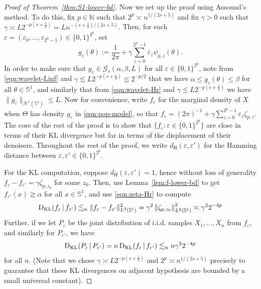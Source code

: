 \documentclass[preprint]{imsart}
\theoremstyle{plain}
\theoremstyle{definition}
\newcommand{\Nbb}{\mathbb{N}}
\newcommand{\Hcal}{\mathcal{H}}
\DeclareMathOperator{\KL}{D_{\textnormal{KL}}}
\begin{document}
\begin{appendix}
\begin{proof}[Proof of Theorem~\ref{thm:S1-lower-bd}]
    Now we set up the proof using Assouad's method.
    To do this, fix $p\in\Nbb$ such that $2^p\asymp n^{1/(2s+5)}$ and fix $\gamma>0$ such that $\gamma\asymp L2^{-p(s+\frac{1}{2})}=Ln^{-(s+\frac{1}{2})/(2s+5)}$.
    Then, for each $\varepsilon = (\varepsilon_0,\ldots, \varepsilon_{2^p-1})\in\{0,1\}^{2^p}$, set
    \begin{equation*}
        g_{\varepsilon}(\theta):= \frac{1}{2\pi}+\gamma\sum_{z=0}^{2^p-1}\varepsilon_z\psi_{p,z}(\theta).
    \end{equation*}
    In order to make sure that $g_{\varepsilon}\in \mathcal{G}_s(\alpha,\beta,L)$ for all $\varepsilon\in\{0,1\}^{2^p}$, note from \eqref{eqn:wavelet-Linf} and $\gamma\lesssim L2^{-p\left(s+\frac{1}{2}\right)}\lesssim 2^{-p/2}$ that we have $\alpha\le g_{\varepsilon}(\theta)\le \beta$ for all $\theta\in\mathbb{S}^1$, and similarly that from \eqref{eqn:wavelet-Hr} and $\gamma\le L2^{-p\left(s+\frac{1}{2}\right)}$ we have $\|g_{\varepsilon}\|_{\Hcal^s(\mathbb{S}^1)}\le L$.
    Now for convenience, write $f_{\varepsilon}$ for the marginal density of $X$ when $\Theta$ has density $g_{\varepsilon}$ in \eqref{eqn:pop-model}, so that $f_{\varepsilon} = (2 \pi)^{-1}+\gamma\sum_{z=0}^{2^p-1}\varepsilon_z\zeta_{p,z}$.
    The core of the rest of the proof is to show that $\{f_{\varepsilon}:\varepsilon\in \{0,1\}^{2^p}\}$ are close in terms of their KL divergence but far in terms of the displacement of their denoisers.
    Throughout the rest of the proof, we write $d_{\mathrm{H}}(\varepsilon,\varepsilon')$ for the Hamming distance between $\varepsilon,\varepsilon'\in\{0,1\}^{2^p}$.

    For the KL computation, suppose $d_{\mathrm{H}}(\varepsilon,\varepsilon')=1$, hence without loss of generality $f_{\varepsilon}-f_{\varepsilon'} = \gamma\zeta_{p,z_0}$ for some $z_0$.
    Then, use Lemma~\ref{lem:f-lower-bd} to get $f_{\varepsilon'}(x)\gtrsim \alpha$ for all $x\in\mathbb{S}^1$, and use \eqref{eqn:zeta-Hr} to compute
    \begin{equation*}
        \KL(f_{\varepsilon}\,|\,f_{\varepsilon'}) \lesssim_{\alpha}\|f_{\varepsilon}-f_{\varepsilon'}\|^2_{L^2(\mathbb{S}^1)} =  \gamma^2\left\|\zeta_{p,z_0}\right\|^2_{L^2(\mathbb{S}^1)}\asymp\gamma^22^{-4p}
        \end{equation*}
    Further, if we let $P_{\varepsilon}$ be the joint distribution of i.i.d. samples $X_1,\ldots, X_n$ from $f_{\varepsilon}$, and similarly for $P_{\varepsilon'}$, we have
    \begin{equation}\label{eqn:KL-computation}
        \KL(P_{\varepsilon}\,|\,P_{\varepsilon'}) = n\KL(f_{\varepsilon}\,|\,f_{\varepsilon'}) \lesssim_{\alpha}n\gamma^22^{-4p} %
        \end{equation}
    for all $n$.
    (Note that we chose $\gamma\asymp L2^{-p(s+\frac{1}{2})}$ and $2^p\asymp n^{1/(2s+5)}$ precisely to guarantee that these KL divergences on adjacent hypothesis are bounded by a small universal constant).


\end{proof}
\end{appendix}
\end{document}
